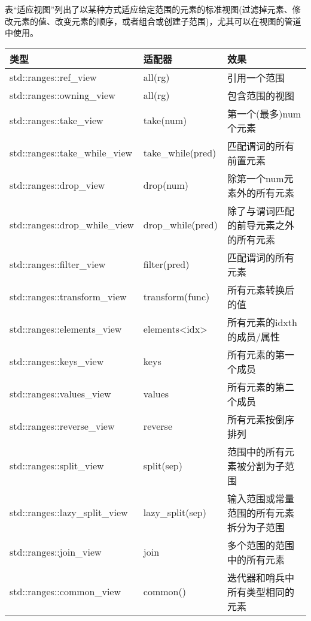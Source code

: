 表“适应视图”列出了以某种方式适应给定范围的元素的标准视图(过滤掉元素、修改元素的值、改变元素的顺序，或者组合或创建子范围)，尤其可以在视图的管道中使用。


\begin{longtable}[c]{|l|l|l|}
\hline
\textbf{类型}                & \textbf{适配器} & \textbf{效果}                               \\ \hline
\endfirsthead
%
\endhead
%
std::ranges::ref\_view       & all(rg)          & 引用一个范围                          \\ \hline
std::ranges::owning\_view    & all(rg)          & 包含范围的视图                       \\ \hline
std::ranges::take\_view      & take(num)        & 第一个(最多)num个元素                \\ \hline
std::ranges::take\_while\_view & take\_while(pred)                    & 匹配谓词的所有前置元素                   \\ \hline
std::ranges::drop\_view      & drop(num)        & 除第一个num元素外的所有元素            \\ \hline
std::ranges::drop\_while\_view & drop\_while(pred)                    & 除了与谓词匹配的前导元素之外的所有元素            \\ \hline
std::ranges::filter\_view    & filter(pred)     & 匹配谓词的所有元素           \\ \hline
std::ranges::transform\_view & transform(func)  & 所有元素转换后的值        \\ \hline
std::ranges::elements\_view    & elements\textless{}idx\textgreater{} & 所有元素的idxth的成员/属性                       \\ \hline
std::ranges::keys\_view      & keys             & 所有元素的第一个成员              \\ \hline
std::ranges::values\_view    & values           & 所有元素的第二个成员             \\ \hline
std::ranges::reverse\_view   & reverse          & 所有元素按倒序排列                 \\ \hline
std::ranges::split\_view     & split(sep)       & 范围中的所有元素被分割为子范围 \\ \hline
std::ranges::lazy\_split\_view & lazy\_split(sep)                     & 输入范围或常量范围的所有元素拆分为子范围 \\ \hline
std::ranges::join\_view      & join             & 多个范围的范围中的所有元素    \\ \hline
std::ranges::common\_view      & common()                             & 迭代器和哨兵中所有类型相同的元素          \\ \hline
\end{longtable}

